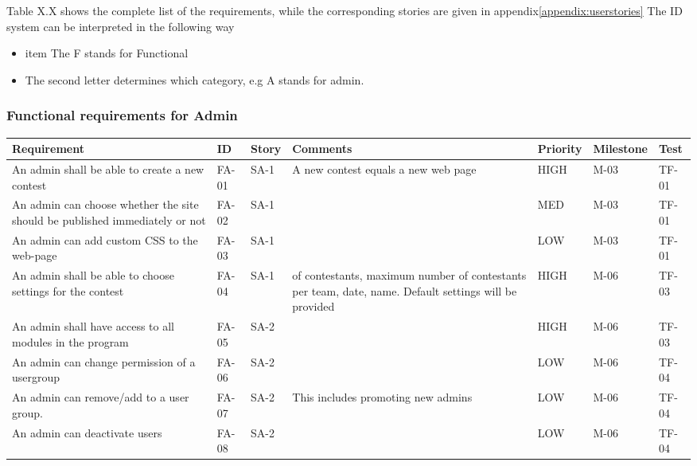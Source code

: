 Table X.X shows the complete list of the requirements, while the
corresponding stories are given in appendix\ref{appendix:userstories}
The ID system can be interpreted in the following way
\begin{itemize}
    \item item The F stands for Functional
    \item The second letter determines which category, e.g A stands for admin.
\end{itemize}

\subsubsection{Functional requirements for Admin}
\begin{supertabular}{|p{2cm}|l|m{0.33795986in}|m{1.2684599in}|m{0.5254598in}|m{1.0983598in}|m{1.0566599in}|}
\hline
Requirement & ID & Story & Comments & Priority & Milestone & Test \\
\hline
An admin shall be able to create a new contest & FA-01 & SA-1 & A new contest
equals a new web page & HIGH & M-03 &
TF-01\\
\hline

An admin can choose whether the site should be published immediately or not &
FA-02 & SA-1 & & MED & M-03 & TF-01\\
\hline

An admin can add custom CSS to the web-page & FA-03 & SA-1 & & LOW & M-03 & TF-01\\
\hline

An admin shall be able to choose settings for the contest & FA-04 & SA-1 & of
contestants, maximum number of contestants per team, date, name.  Default
settings will be provided & HIGH & M-06 & TF-03\\
\hline

An admin shall have access to all modules in the program & FA-05 & SA-2 & &
HIGH & M-06 & TF-03\\ 
\hline

An admin can change permission of a usergroup & FA-06 & SA-2 & & LOW & M-06 &
TF-04\\ 
\hline

An admin can remove/add to a user group. & FA-07 & SA-2 & This
includes promoting new admins & LOW & M-06 & TF-04\\ 
\hline 

An admin can deactivate users & FA-08 & SA-2 & & LOW & M-06 & TF-04\\ 
\hline


\end{supertabular}
